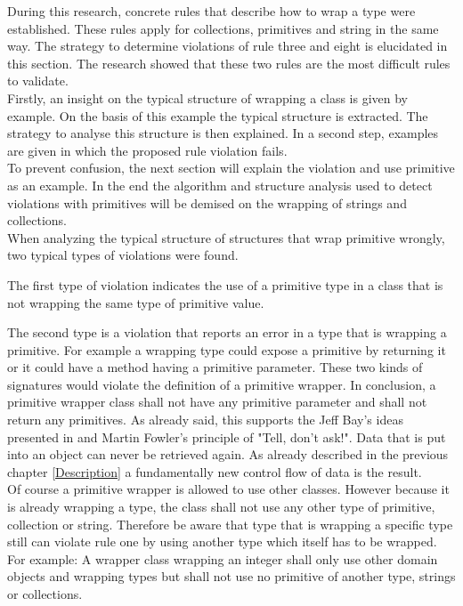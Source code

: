 During this research, concrete rules that describe how to wrap a type were established. These rules apply for collections, primitives and string in the same way. The strategy to determine violations of rule three and eight is elucidated in this section. The research showed that these two rules are the most difficult rules to validate.
\\

Firstly, an insight on the typical structure of wrapping a class is given by example. On the basis of this example the typical structure is extracted. The strategy to analyse this structure is then explained. In a second step, examples are given in which the proposed rule violation fails. 
\\

To prevent confusion, the next section will explain the violation and use primitive as an example. In the end the algorithm and structure analysis used to detect violations with primitives will be demised on the wrapping of strings and collections.
\\

When analyzing the typical structure of structures that wrap primitive wrongly, two typical types of violations were found. 

The first type of violation indicates the use of a primitive type in a class that is not wrapping the same type of primitive value. 

The second type is a violation that reports an error in a type that is wrapping a primitive. For example a wrapping type could expose a primitive by returning it or it could have a method having a primitive parameter. These two kinds of signatures would violate the definition of a primitive wrapper. In conclusion, a primitive wrapper class shall not have any primitive parameter and shall not return any primitives. As already said, this supports the Jeff Bay's ideas presented in \cite{oc2008} and Martin Fowler's principle of "Tell, don't ask!"\cite{telldontaskoriginal}. Data that is put into an object can never be retrieved again. As already described in the previous chapter \ref{Description} a fundamentally new control flow of data is the result.
\\

Of course a primitive wrapper is allowed to use other classes. However because it is already wrapping a type, the class shall not use any other type of primitive, collection or string. Therefore be aware that type that is wrapping a specific type still can violate rule one by using another type which itself has to be wrapped. For example: A wrapper class wrapping an integer shall only use other domain objects and wrapping types but shall not use no primitive of another type, strings or collections. 
\\

